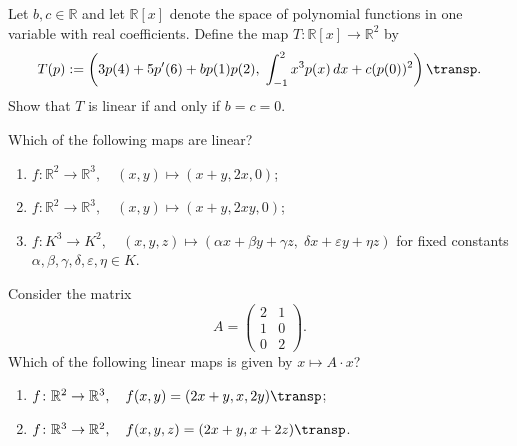 \begin{exercise}
\label{exc:polynomial_integral_eval_linear_map}
Let $b, c \in \mathbb{R}$ and let $\mathbb{R}[x]$ denote the space of polynomial functions in one variable with real coefficients. Define the map $T \colon \mathbb{R}[x] \to \mathbb{R}^2$ by
\[
T(p) := \left( 3p(4) + 5p'(6) + b p(1)p(2), \; \int_{-1}^2 x^3 p(x) \, dx + c (p(0))^2 \right)\transp.
\]
Show that $T$ is linear if and only if $b = c = 0$.
\end{exercise}

\begin{exercise}
\label{exc:identifying_linear_maps_mc}
Which of the following maps are linear?
\begin{enumerate}
    \item $f \colon \mathbb{R}^2 \to \mathbb{R}^3, \quad (x, y) \mapsto (x + y, 2x, 0)$;
    \item $f \colon \mathbb{R}^2 \to \mathbb{R}^3, \quad (x, y) \mapsto (x + y, 2xy, 0)$;
    \item $f \colon K^3 \to K^2, \quad (x, y, z) \mapsto (\alpha x + \beta y + \gamma z, \; \delta x + \varepsilon y + \eta z)$ for fixed constants $\alpha, \beta, \gamma, \delta, \varepsilon, \eta \in K$.
\end{enumerate}
\end{exercise}

\begin{exercise}
\label{exc:matrix_map_mc}
Consider the matrix
\[
A = \begin{pmatrix} 2 & 1 \\ 1 & 0 \\ 0 & 2 \end{pmatrix}.
\]
Which of the following linear maps is given by $x \mapsto A \cdot x$?
\begin{enumerate}
    \item $f \colon \mathbb{R}^2 \to \mathbb{R}^3, \quad f(x, y) = (2x + y, x, 2y)\transp$;
    \item $f \colon \mathbb{R}^3 \to \mathbb{R}^2, \quad f(x, y, z) = (2x + y, x + 2z)\transp$.
\end{enumerate}
\end{exercise}

